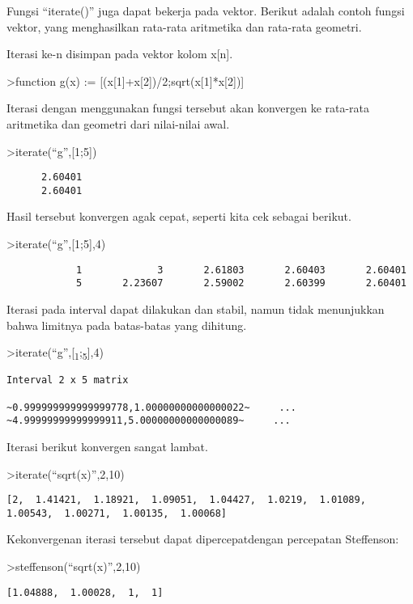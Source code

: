 \documentclass[
]{book}
\begin{document}
Fungsi ``iterate()'' juga dapat bekerja pada vektor. Berikut adalah contoh fungsi vektor, yang menghasilkan rata-rata aritmetika dan rata-rata geometri.

Iterasi ke-n disimpan pada vektor kolom x{[}n{]}.

\textgreater function g(x) := {[}(x{[}1{]}+x{[}2{]})/2;sqrt(x{[}1{]}*x{[}2{]}){]}

Iterasi dengan menggunakan fungsi tersebut akan konvergen ke rata-rata aritmetika dan geometri dari nilai-nilai awal.

\textgreater iterate(``g'',{[}1;5{]})

\begin{verbatim}
      2.60401 
      2.60401 
\end{verbatim}

Hasil tersebut konvergen agak cepat, seperti kita cek sebagai berikut.

\textgreater iterate(``g'',{[}1;5{]},4)

\begin{verbatim}
            1             3       2.61803       2.60403       2.60401 
            5       2.23607       2.59002       2.60399       2.60401 
\end{verbatim}

Iterasi pada interval dapat dilakukan dan stabil, namun tidak menunjukkan bahwa limitnya pada batas-batas yang dihitung.

\textgreater iterate(``g'',{[}\textsubscript{1};\textsubscript{5}{]},4)

\begin{verbatim}
Interval 2 x 5 matrix

~0.999999999999999778,1.00000000000000022~     ...
~4.99999999999999911,5.00000000000000089~     ...
\end{verbatim}

Iterasi berikut konvergen sangat lambat.

\textgreater iterate(``sqrt(x)'',2,10)

\begin{verbatim}
[2,  1.41421,  1.18921,  1.09051,  1.04427,  1.0219,  1.01089,
1.00543,  1.00271,  1.00135,  1.00068]
\end{verbatim}

Kekonvergenan iterasi tersebut dapat dipercepatdengan percepatan Steffenson:

\textgreater steffenson(``sqrt(x)'',2,10)

\begin{verbatim}
[1.04888,  1.00028,  1,  1]
\end{verbatim}
\end{document}
